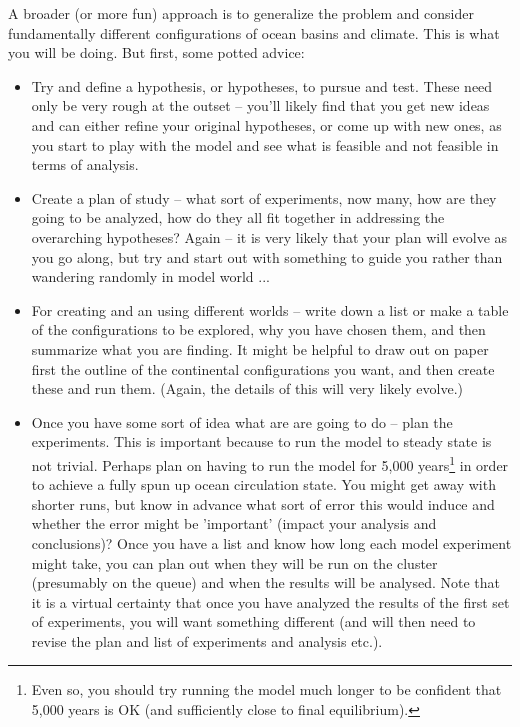 A broader (or more fun) approach is to generalize the problem and consider fundamentally different configurations of ocean basins and climate. This is what you will be doing. But first, some potted advice:

\vspace{2mm}
\begin{itemize}[noitemsep]
\vspace{1mm}
\item Try and define a hypothesis, or hypotheses, to pursue and test. These need only be very rough at the outset -- you'll likely find that you get new ideas and can either refine your original hypotheses, or come up with new ones, as you start to play with the model and see what is feasible and not feasible in terms of analysis.
\vspace{1mm}
\item Create a plan of study -- what sort of experiments, now many, how are they going to be analyzed, how do they all fit together in addressing the overarching hypotheses? Again -- it is very likely that your plan will evolve as you go along, but try and start out with something to guide you rather than wandering randomly in model world ...
\vspace{1mm}
\item For creating and an using different worlds -- write down a list or make a table of the configurations to be explored, why you have chosen them, and then summarize what you are finding. It might be helpful to draw out on paper first the outline of the continental configurations you want, and then create these and run them. (Again, the details of this will very likely evolve.)
\vspace{1mm}
\item Once you have some sort of idea what are are going to do -- plan the experiments. This is important because to run the model to steady state is not trivial. Perhaps plan on having to run the model for 5,000 years\footnote{Even so, you should try running the model much longer to be confident that 5,000 years is OK (and sufficiently close to final equilibrium).} in order to achieve a fully spun up ocean circulation state. You might get away with shorter runs, but know in advance what sort of error this would induce and whether the error might be 'important' (impact your analysis and conclusions)? Once you have a list and know how long each model experiment might take, you can plan out when they will be run on the cluster (presumably on the queue) and when the results will be analysed. Note that it is a virtual certainty that once you have analyzed the results of the first set of experiments, you will want something different (and will then need to revise the plan and list of experiments and analysis etc.).
\end{itemize}
\vspace{2mm}

